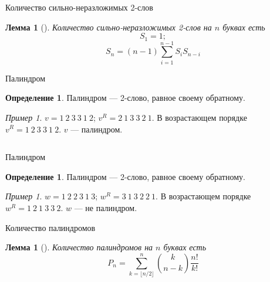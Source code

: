 \documentclass[14pt, aspectratio=169, notheorems]{beamer}
\theoremstyle{plain}
\newtheorem{lemma}[theorem]{Лемма}
\theoremstyle{definition}
\newtheorem{definition}[theorem]{Определение}
\theoremstyle{remark}
\newtheorem{example}[theorem]{Пример}
\begin{document}
\begin{frame}{Количество сильно-неразложимых 2-слов}
    \begin{lemma}[]
    Количество сильно-неразложимых 2-слов на $n$ буквах есть 
    \begin{equation*}
        S_1 = 1;
    \end{equation*}
    \begin{equation*}
        S_n = (n - 1) \sum_{i = 1}^{n - 1}S_i S_{n - i}
    \end{equation*}
    \end{lemma}
\end{frame}


\begin{frame}{Палиндром}
   \begin{definition}
    Палиндром --- 2-слово, равное своему обратному.
    \end{definition}
    \begin{example}
    $v = 1\ 2\ 3\ 3\ 1\ 2$; $v^{R} = 2\ 1\ 3\ 3\ 2\ 1$. В возрастающем порядке $v^{R} = 1\ 2\ 3\ 3\ 1\ 2$. $v$ --- палиндром.
    \end{example}
    \begin{columns}
        \centering
        
        \centering
        
    \end{columns}
\end{frame}

\begin{frame}{Палиндром}
   \begin{definition}
    Палиндром --- 2-слово, равное своему обратному.
    \end{definition}
    \begin{example}
    $w = 1\ 2\ 2\ 3\ 1\ 3$; $w^{R} = 3\ 1\ 3\ 2\ 2\ 1$. В возрастающем порядке $w^{R} = 1\ 2\ 1\ 3\ 3\ 2$. $w$ --- не палиндром. 
    \end{example}

    \centering
    
\end{frame}

\begin{frame}{Количество палиндромов}
   \begin{lemma}[]
    Количество палиндромов на $n$ буквах есть
    \[
    P_n = \sum_{k=\lfloor n/2 \rfloor}^{n} \binom{k}{n - k} \frac{n!}{k!}
    \]
    \end{lemma} 
\end{frame}
\end{document}
